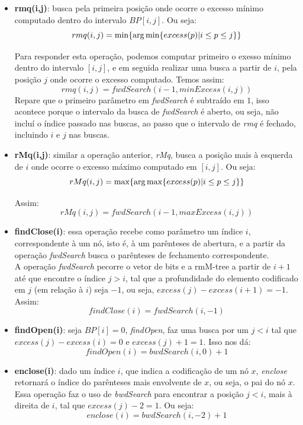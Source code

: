     \begin{itemize}
        \item \textbf{rmq(i,j)}: busca pela primeira posição onde ocorre o excesso mínimo computado dentro do intervalo  $BP[i,j]$. Ou seja:
            $$rmq(i,j) =\min \{ \operatorname*{arg\,min}\{excess(p) | i \leq p \leq j\}\} $$
    
        Para responder esta operação, podemos computar primeiro o exesso mínimo dentro do intervalo $[i,j]$, e em seguida realizar uma busca a partir de $i$, pela posição $j$ onde ocorre o excesso computado.
        Temos assim:
        $$rmq(i,j) = fwdSearch(i-1,minExcess(i,j))$$
        Repare que o primeiro parâmetro  em \textit{fwdSearch} é subtraído em $1$, isso acontece porque o intervalo da busca  de \textit{fwdSearch} é aberto, ou seja, não incluí o índice passado nas buscas, ao passo que o intervalo de \textit{rmq} é fechado, incluindo $i$ e  $j$ nas buscas. 
    
        \item \textbf{rMq(i,j)}: similar a operação anterior, \textit{rMq}, busca a posição mais à esquerda de $i$ onde ocorre o excesso máximo computado em $[i,j]$. Ou seja:
        $$rMq(i,j) =\max\{ \operatorname*{arg\,max}\{excess(p) | i \leq p \leq j\}\} $$   
        
        Assim:
            $$rMq(i,j) = fwdSearch(i-1, maxExcess(i,j))$$


        \item \textbf{findClose(i)}: essa operação recebe como parâmetro um índice $i$, correspondente à um nó, isto é, à um parênteses de abertura, e a partir da operação \textit{fwdSearch} busca o parênteses de fechamento correspondente. \\
        A operação \textit{fwdSearch} pecorre o vetor de bits e a rmM-tree a partir de $i+1$ até que encontre o índice $j > i $, tal que a profundidade do elemento codificado em $j$ (em relação à $i$) seja $-1$, ou seja, $excess(j) - excess(i+1) = -1 $.  Assim:
        $$findClose(i) = fwdSearch(i,-1)$$
            
        \item \textbf{findOpen(i)}:  seja $BP[i]=0$, \textit{findOpen}, faz uma busca por um $j < i $ tal que $excess(j) - excess(i) = 0$ e $excess(j)+1=1$. 
        Isso nos dá:
        $$findOpen(i) = bwdSearch(i,0)+1$$
        
        \item \textbf{enclose(i)}: dado um índice $i$, que indica a codificação de um nó $x$, \textit{enclose} retornará o índice do parênteses mais envolvente de $x$, ou seja, o pai do nó $x$. Essa operação faz o uso de \textit{bwdSearch} para encontrar a posição $j<i$, mais à direita de $i$, tal que $excess(j) - 2 = 1$. Ou seja:
        $$enclose(i) = bwdSearch(i,-2) + 1$$


\end{itemize}
